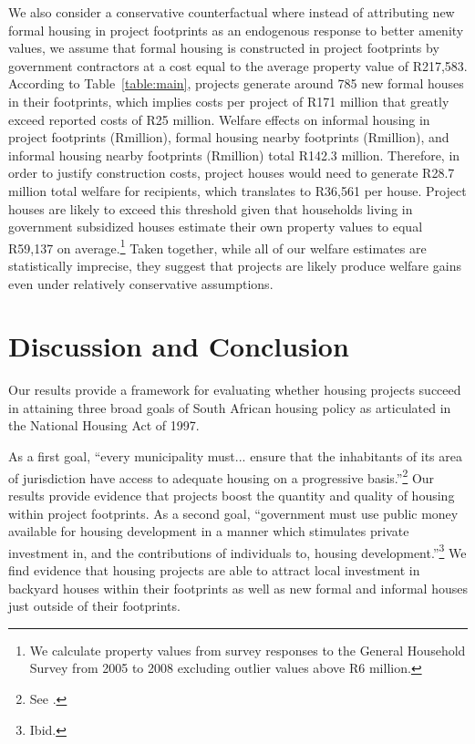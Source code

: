 \documentclass[12pt]{article}
\begin{document}
We also consider a conservative counterfactual where instead of attributing new formal housing in project footprints as an endogenous response to better amenity values, we assume that formal housing is constructed in project footprints by government contractors at a cost equal to the average property value of R217,583.  According to Table~\ref{table:main}, projects generate around 785 new formal houses in their footprints, which implies costs per project of R171 million that greatly exceed reported costs of R25 million.  Welfare effects on informal housing in project footprints (Rmillion), formal housing nearby footprints (Rmillion), and informal housing nearby footprints (Rmillion) total R142.3 million.  Therefore, in order to justify construction costs, project houses would need to generate R28.7 million total welfare for recipients, which translates to R36,561 per house.  Project houses are likely to exceed this threshold given that households living in government subsidized houses estimate their own property values to equal R59,137 on average.\footnote{We calculate property values from survey responses to the General Household Survey from 2005 to 2008 excluding outlier values above R6 million.}   Taken together, while all of our welfare estimates are statistically imprecise, they suggest that projects are likely produce welfare gains even under relatively conservative assumptions.




\section{Discussion and Conclusion}\label{section:discussion}


Our results provide a framework for evaluating whether housing projects succeed in attaining three broad goals of South African housing policy as articulated in the National Housing Act of 1997.

As a first goal, ``every municipality must... ensure that the inhabitants of its area of jurisdiction have access to adequate housing on a progressive basis.''\footnote{See \cite{housingact}.}  Our results provide evidence that projects boost the quantity and quality of housing within project footprints.  As a second goal, ``government must use public money available for housing development in a manner which stimulates private investment in, and the contributions of individuals to, housing development.''\footnote{Ibid.}    We find evidence that housing projects are able to attract local investment in backyard houses within their footprints as well as new formal and informal houses just outside of their footprints.  
\end{document}
